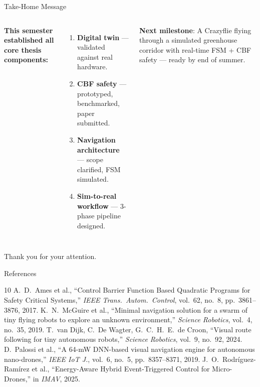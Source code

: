 \documentclass[aspectratio=169, 11pt]{beamer}
\begin{document}
\begin{frame}[fragile]{Take-Home Message}
\begin{columns}[T]
\textbf{This semester established all core thesis components:}
\begin{enumerate}
  \item \textcolor{donegreen}{\textbf{Digital twin}} --- validated against real hardware.
  \item \textcolor{donegreen}{\textbf{CBF safety}} --- prototyped, benchmarked, paper submitted.
  \item \textcolor{progressblue}{\textbf{Navigation architecture}} --- scope clarified, FSM simulated.
  \item \textcolor{progressblue}{\textbf{Sim-to-real workflow}} --- 3-phase pipeline designed.
\end{enumerate}

\vspace{0.5em}
\textbf{Next milestone}: A Crazyflie flying through a simulated greenhouse corridor with real-time FSM + CBF safety --- ready by end of summer.

\centering
{}
\end{columns}

\vspace{0.5em}
\centering
\Large Thank you for your attention.
\end{frame}

\begin{frame}[allowframebreaks]{References}
\scriptsize
\begin{thebibliography}{10}
 A.~D.~Ames et al., ``Control Barrier Function Based Quadratic Programs for Safety Critical Systems,'' \emph{IEEE Trans.\ Autom.\ Control}, vol.~62, no.~8, pp.~3861--3876, 2017.
 K.~N.~McGuire et al., ``Minimal navigation solution for a swarm of tiny flying robots to explore an unknown environment,'' \emph{Science Robotics}, vol.~4, no.~35, 2019.
 T.~van Dijk, C.~De Wagter, G.~C.~H.~E.~de Croon, ``Visual route following for tiny autonomous robots,'' \emph{Science Robotics}, vol.~9, no.~92, 2024.
 D.~Palossi et al., ``A 64-mW DNN-based visual navigation engine for autonomous nano-drones,'' \emph{IEEE IoT J.}, vol.~6, no.~5, pp.~8357--8371, 2019.
 J.~O.~Rodr\'iguez-Ram\'irez et al., ``Energy-Aware Hybrid Event-Triggered Control for Micro-Drones,'' in \emph{IMAV}, 2025.
\end{thebibliography}
\end{frame}
\end{document}
